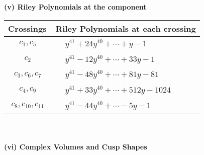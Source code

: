 \documentclass[1p]{elsarticle_modified}
\theoremstyle{definition}
\begin{document}
\newpage\renewcommand{\arraystretch}{1}
\flushleft \textbf{(v) Riley Polynomials at the component}\newline \\
\begin{tabular}{m{50pt}|m{274pt}}
Crossings & \hspace{64pt}Riley Polynomials at each crossing \\
\hline $$\begin{aligned}c_{1},c_{5}\end{aligned}$$&$\begin{aligned}
&y^{41}+24 y^{40}+\cdots+y-1
\end{aligned}$\\
\hline $$\begin{aligned}c_{2}\end{aligned}$$&$\begin{aligned}
&y^{41}-12 y^{40}+\cdots+33 y-1
\end{aligned}$\\
\hline $$\begin{aligned}c_{3},c_{6},c_{7}\end{aligned}$$&$\begin{aligned}
&y^{41}-48 y^{40}+\cdots+81 y-81
\end{aligned}$\\
\hline $$\begin{aligned}c_{4},c_{9}\end{aligned}$$&$\begin{aligned}
&y^{41}+33 y^{40}+\cdots+512 y-1024
\end{aligned}$\\
\hline $$\begin{aligned}c_{8},c_{10},c_{11}\end{aligned}$$&$\begin{aligned}
&y^{41}-44 y^{40}+\cdots-5 y-1
\end{aligned}$\\
\hline
\end{tabular}\\~\\
\newpage\flushleft \textbf{(vi) Complex Volumes and Cusp Shapes}
\end{document}
